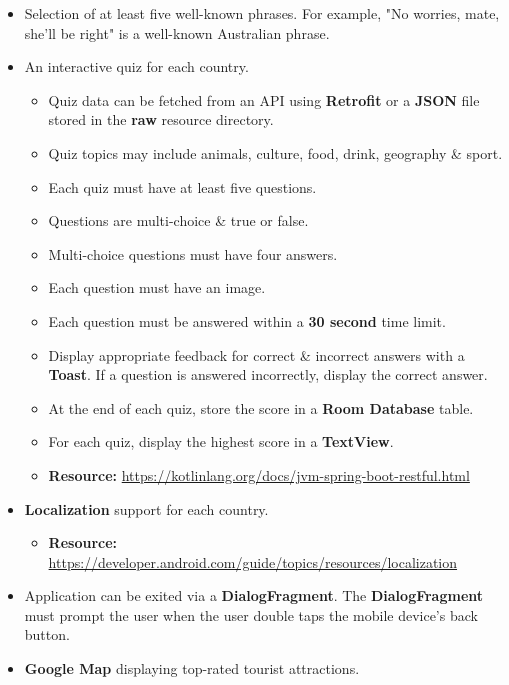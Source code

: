 \documentclass{article}
\begin{document}
\begin{itemize}
\begin{itemize}
	      \end{itemize}
	\item Selection of at least five well-known phrases. For example, "No worries, mate, she'll be right" is a well-known Australian phrase.
	\item An interactive quiz for each country.
	      \begin{itemize}
		      \item Quiz data can be fetched from an API using \textbf{Retrofit} or a \textbf{JSON} file stored in the \textbf{raw} resource directory.
		      \item Quiz topics may include animals, culture, food, drink, geography \& sport.
		      \item Each quiz must have at least five questions.
		      \item Questions are multi-choice \& true or false.
		      \item Multi-choice questions must have four answers.
		      \item Each question must have an image.
		      \item Each question must be answered within a \textbf{30 second} time limit.
		      \item Display appropriate feedback for correct \& incorrect answers with a \textbf{Toast}. If a question is answered incorrectly, display the correct answer.
		      \item At the end of each quiz, store the score in a \textbf{Room Database} table.
		      \item For each quiz, display the highest score in a \textbf{TextView}.
		      \item \textbf{Resource:} \footnotesize\href{https://kotlinlang.org/docs/jvm-spring-boot-restful.html}{https://kotlinlang.org/docs/jvm-spring-boot-restful.html}
	      \end{itemize}
	\item \textbf{Localization} support for each country.
	      \begin{itemize}
		      \item \textbf{Resource:} \footnotesize\href{https://developer.android.com/guide/topics/resources/localization/}{https://developer.android.com/guide/topics/resources/localization}
	      \end{itemize}
	\item Application can be exited via a \textbf{DialogFragment}. The \textbf{DialogFragment} must prompt the user when the user double taps the mobile device's back button.
	\item \textbf{Google Map} displaying top-rated tourist attractions.

\end{itemize}
\end{document}
